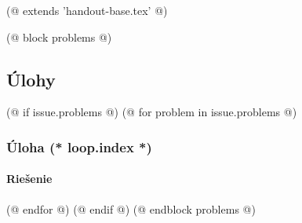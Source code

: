 (@ extends 'handout-base.tex' @)

(@ block problems @)
    \subsection{Úlohy}
    (@ if issue.problems @)
        (@ for problem in issue.problems @)
            \subsubsection{Úloha (* loop.index *)}
            \paragraph{Riešenie}
        (@ endfor @)
    (@ endif @)
(@ endblock problems @)
